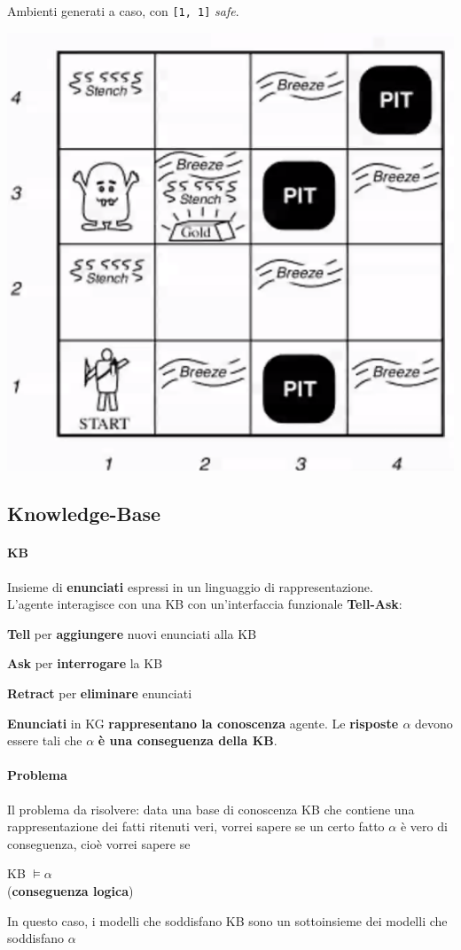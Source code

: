 \documentclass[10pt]{book}
\begin{document}
\begin{multicols}{2}
Ambienti generati a caso, con \texttt{[1, 1]} \textit{safe}.
\begin{center}
	\includegraphics[scale=0.6]{wumpus.png}
\end{center}
\end{multicols}
\subsection{Knowledge-Base}
\paragraph{KB} Insieme di \textbf{enunciati} espressi in un linguaggio di rappresentazione.\\
L'agente interagisce con una KB con un'interfaccia funzionale \textbf{Tell-Ask}:
\begin{list}{}{}
	\item \textbf{Tell} per \textbf{aggiungere} nuovi enunciati alla KB
	\item \textbf{Ask} per \textbf{interrogare} la KB
	\item \textbf{Retract} per \textbf{eliminare} enunciati
\end{list}
\textbf{Enunciati} in KG \textbf{rappresentano la conoscenza} agente. Le \textbf{risposte $\alpha$} devono essere tali che $\alpha$ \textbf{è una conseguenza della KB}.
\paragraph{Problema} Il problema da risolvere: data una base di conoscenza KB che contiene una rappresentazione dei fatti ritenuti veri, vorrei sapere se un certo fatto $\alpha$ è vero di conseguenza, cioè vorrei sapere se 
\begin{center}
KB $\vDash \alpha$\\(\textbf{conseguenza logica})
\end{center}
In questo caso, i modelli che soddisfano KB sono un sottoinsieme dei modelli che soddisfano $\alpha$
\pagebreak
\end{document}
